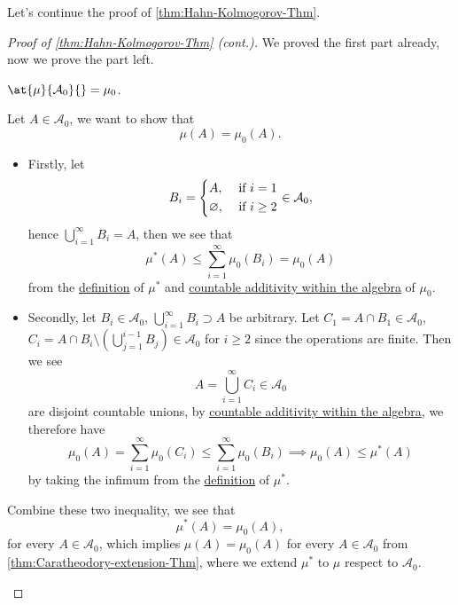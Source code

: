 Let's continue the proof of \autoref{thm:Hahn-Kolmogorov-Thm}.
\begin{proof}[Proof of \autoref{thm:Hahn-Kolmogorov-Thm} (cont.)]\label{pf:Hahn-Kolmogorov-Thm-cont}
	We proved the first part already, now we prove the part left.
	\begin{claim}
		\(\at{\mu }{\mathcal{\MakeUppercase{a}} _0}{} = \mu _0\).
	\end{claim}
	\begin{explanation}
		Let \(A\in \mathcal{A} _0\), we want to show that
		\[
			\mu (A) = \mu_0(A).
		\]
		\begin{itemize}
			\item Firstly, let
			      \[
				      B_{i} = \begin{dcases}
					      A,            & \text{ if } i= 1    \\
					      \varnothing , & \text{ if } i\geq 2
				      \end{dcases}\in \mathcal{A} _0,
			      \]
			      hence \(\bigcup\limits_{i=1}^{\infty} B_{i} = A\), then we see that
			      \[
				      \mu ^{\ast} (A)\leq \sum\limits_{i=1}^{\infty} \mu _0(B_{i}) = \mu _0(A)
			      \]
			      from the \hyperref[prop:outer-measure]{definition} of \(\mu ^{\ast} \) and \hyperref[def:pre-measure-countable-additivity-within-the-algebra]{countable additivity within the algebra}
			      of \(\mu _0\).
			\item Secondly, let \(B_{i}\in \mathcal{A} _0\), \(\bigcup\limits_{i=1}^{\infty} B_{i}\supset A\) be arbitrary.
			      Let \(C_1 = A\cap B_1\in \mathcal{A} _0\), \(C_{i} = A\cap B_{i}\setminus \left(\bigcup\limits_{j=1}^{i-1} B_{j}\right)\in \mathcal{A} _0\) for \(i\geq 2\)
			      since the operations are finite. Then we see
			      \[
				      A = \bigcup\limits_{i=1}^{\infty} C_{i}\in \mathcal{A} _0
			      \]
			      are disjoint countable unions, by \hyperref[def:pre-measure-countable-additivity-within-the-algebra]{countable additivity within the algebra},
			      we therefore have
			      \[
				      \mu _0(A) = \sum\limits_{i=1}^{\infty} \mu _0(C_{i}) \leq \sum\limits_{i=1}^{\infty} \mu_0 (B_{i})\implies \mu _0(A)\leq \mu ^{\ast} (A)
			      \]
			      by taking the infimum from the \hyperref[prop:outer-measure]{definition} of \(\mu ^{\ast} \).
		\end{itemize}
		Combine these two inequality, we see that
		\[
			\mu ^{\ast} (A) = \mu _0(A),
		\]
		for every \(A\in\mathcal{A} _0\), which implies \(\mu (A) = \mu _0(A)\) for every \(A\in \mathcal{A}_0\) from \autoref{thm:Caratheodory-extension-Thm},
		where we extend \(\mu ^{\ast} \) to \(\mu \) respect to \(\mathcal{A}_0\).
	\end{explanation}
\end{proof}

